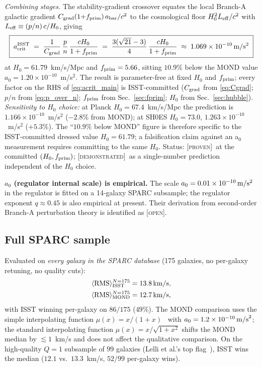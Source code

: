 \documentclass[aps,prd,twocolumn,nofootinbib,floatfix,superscriptaddress]{revtex4-2}
\newcommand{\PROVEN}{{\color{black!75!green}\textsc{[proven]}}}
\newcommand{\DEMO}{{\color{black!70!blue}\textsc{[demonstrated]}}}
\newcommand{\OPEN}{{\color{black!60!red}\textsc{[open]}}}
\newcommand{\fprim}{f_{\rm prim}}
\begin{document}
\emph{Combining stages.} The stability-gradient crossover equates the
local Branch-A galactic gradient
$C_{\rm grad}(1{+}f_{\rm prim})\,a_{\rm bar}/c^2$ to the cosmological
floor $H_0^2 L_{\rm eff}/c^2$ with
$L_{\rm eff} \equiv (p/n)\,c/H_0$, giving
\begin{equation}
\label{eq:acrit_main}
\boxed{\;
a_{\rm crit}^{\rm ISST} \;=\;
\frac{1}{C_{\rm grad}}\,\frac{p}{n}\,
\frac{cH_0}{1+f_{\rm prim}}
\;=\; \frac{3(\sqrt{21}-3)}{4}\,\frac{cH_0}{1+f_{\rm prim}}
\;\approx\; 1.069\times 10^{-10}\,{\rm m/s^2}
\;}
\end{equation}
at $H_0 = 61.79$~km/s/Mpc and $f_{\rm prim} = 5.66$, sitting
$10.9\%$ below the MOND value $a_0 = 1.20\times 10^{-10}$~m/s$^2$.
The result is parameter-free at fixed $H_0$ and $\fprim$; every
factor on the RHS of \eqref{eq:acrit_main} is ISST-committed
($C_{\rm grad}$ from \eqref{eq:Cgrad}; $p/n$ from
\eqref{eq:p_over_n}; $f_{\rm prim}$ from
Sec.~\ref{sec:fprim}; $H_0$ from Sec.~\ref{sec:hubble}).
\emph{Sensitivity to $H_0$ choice:} at Planck $H_0 = 67.4$~km/s/Mpc
the prediction is $1.166\times 10^{-10}$~m/s$^2$ ($-2.8\%$ from
MOND); at SH0ES $H_0 = 73.0$, $1.263\times 10^{-10}$~m/s$^2$
($+5.3\%$). The ``$10.9\%$ below MOND'' figure is therefore
specific to the ISST-committed dressed value $H_0 = 61.79$; a
falsification claim against an a$_0$ measurement requires
committing to the same $H_0$. Status: \PROVEN\ at the committed
$(H_0, \fprim)$; \DEMO\ as a single-number prediction independent
of the $H_0$ choice.

\textbf{$a_0$ (regulator internal scale) is empirical.} The scale
$a_0 = 0.01\times 10^{-10}\,{\rm m/s^2}$ in the regulator is fitted
on a 14-galaxy SPARC subsample; the regulator exponent $q\approx
0.45$ is also empirical at present. Their derivation from
second-order Branch-A perturbation theory is identified as \OPEN.

\subsection{Full SPARC sample}

Evaluated on \emph{every galaxy in the SPARC database}
(175 galaxies, no per-galaxy retuning, no quality cuts):
\begin{align*}
\langle{\rm RMS}\rangle_{\rm ISST}^{N=175} &= 13.8\,{\rm km/s},\\
\langle{\rm RMS}\rangle_{\rm MOND}^{N=175} &= 12.7\,{\rm km/s},
\end{align*}
with ISST winning per-galaxy on $86/175$ ($49\%$). The MOND comparison
uses the simple interpolating function
$\mu(x)=x/(1+x)$~\cite{FamaeyMcGaugh2012} with
$a_0 = 1.2\times 10^{-10}\,{\rm m/s}^2$; the standard interpolating
function $\mu(x)=x/\sqrt{1+x^2}$ shifts the MOND median by
$\lesssim 1$~km/s and does not affect the qualitative comparison.
On the high-quality $Q{=}1$ subsample of 99 galaxies (Lelli et al.'s
top flag~\cite{Lelli2016}), ISST wins the median ($12.1$ vs.\
$13.3$~km/s, $52/99$ per-galaxy wins).
\end{document}
